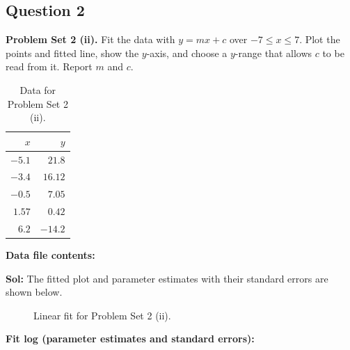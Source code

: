 \documentclass{book}
\begin{document}
\subsection*{Question 2}
\noindent\textbf{Problem Set 2 (ii).} Fit the data with $y=mx+c$ over $-7\le x\le7$. Plot the points and fitted line, show the $y$-axis, and choose a $y$-range that allows $c$ to be read from it. Report $m$ and $c$.
\begin{table}[H]
\centering
\caption{Data for Problem Set 2 (ii).}
\begin{tabular}{|r|r|}
\hline
$x$ & $y$ \\ \hline
$-5.1$ & $21.8$ \\ \hline
$-3.4$ & $16.12$ \\ \hline
$-0.5$ & $7.05$ \\ \hline
$1.57$ & $0.42$ \\ \hline
$6.2$ & $-14.2$ \\ \hline
\end{tabular}
\end{table}
\noindent\textbf{Data file contents:}

\noindent\textbf{Sol:} The fitted plot and parameter estimates with their standard errors are shown below.

\begin{figure}[H]
    \centering
    
    \caption{Linear fit for Problem Set 2 (ii).}
\end{figure}
\noindent\textbf{Fit log (parameter estimates and standard errors):}

\newpage
\end{document}

